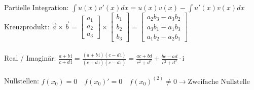 	Partielle Integration: $\int u(x) v'(x) dx = u(x)v(x) - \int u'(x) v(x) dx$\\
	
	Kreuzprodukt: $\vec{a}\times\vec{b}
	  =
	  \begin{bmatrix}a_1 \\ a_2 \\ a_3\end{bmatrix}
	  \times
	  \begin{bmatrix}b_1 \\ b_2 \\ b_3 \end{bmatrix}
	  =
	  \begin{bmatrix}
	    a_2b_3 - a_3b_2 \\
	    a_3b_1 - a_1b_3 \\
	    a_1b_2 - a_2b_1
	  \end{bmatrix}$\\
	\\
	Real / Imaginär: $\frac{a+b\,\mathrm i}{c+d\,\mathrm i} = \frac{(a+b\,\mathrm i)(c-d\,\mathrm i)}{(c+d\,\mathrm i)(c-d\,\mathrm i)} = \frac{ac+bd}{c^2+d^2}+\frac{bc-ad}{c^2+d^2}\cdot\mathrm i$\\
	\\
	Nullstellen: $f(x_0)=0 \quad f(x_0)'=0 \quad f(x_0)^{(2)} \neq 0 \rightarrow \text{Zweifache Nullstelle}$ 
